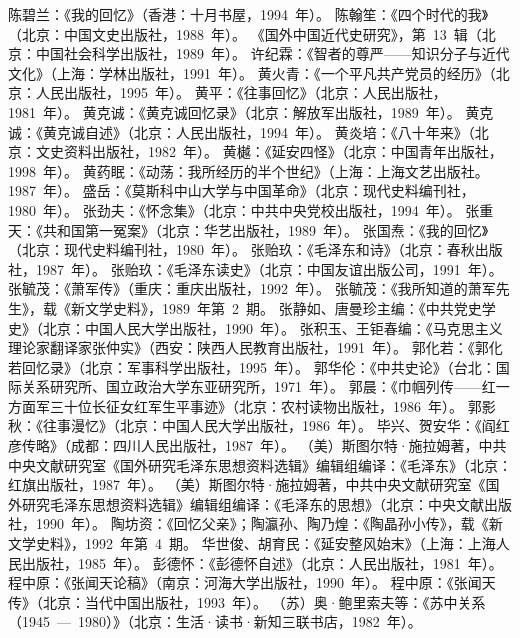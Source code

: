 \begin{thebibliography}{999}
\bibitem{}陈碧兰：《我的回忆》（香港：十月书屋，1994~年）。
\bibitem{}陈翰笙：《四个时代的我》（北京：中国文史出版社，1988~年）。
\bibitem{}《国外中国近代史研究》，第~13~辑（北京：中国社会科学出版社，1989~年）。
\bibitem{}许纪霖：《智者的尊严——知识分子与近代文化》（上海：学林出版社，1991~年）。
\bibitem{}黄火青：《一个平凡共产党员的经历》（北京：人民出版社，1995~年）。
\bibitem{}黄平：《往事回忆》（北京：人民出版社，1981~年）。
\bibitem{}黄克诚：《黄克诚回忆录》（北京：解放军出版社，1989~年）。
\bibitem{}黄克诚：《黄克诚自述》（北京：人民出版社，1994~年）。
\bibitem{}黄炎培：《八十年来》（北京：文史资料出版社，1982~年）。
\bibitem{}黄樾：《延安四怪》（北京：中国青年出版社，1998~年）。
\bibitem{}黄药眠：《动荡：我所经历的半个世纪》（上海：上海文艺出版社。1987~年）。
\bibitem{}盛岳：《莫斯科中山大学与中国革命》（北京：现代史料编刊社，1980~年）。
\bibitem{}张劲夫：《怀念集》（北京：中共中央党校出版社，1994~年）。
\bibitem{}张重天：《共和国第一冤案》（北京：华艺出版社，1989~年）。
\bibitem{}张国焘：《我的回忆》（北京：现代史料编刊社，1980~年）。
\bibitem{}张贻玖：《毛泽东和诗》（北京：春秋出版社，1987~年）。
\bibitem{}张贻玖：《毛泽东读史》（北京：中国友谊出版公司，1991~年）。
\bibitem{}张毓茂：《萧军传》（重庆：重庆出版社，1992~年）。
\bibitem{}张毓茂：《我所知道的萧军先生》，载《新文学史料》，1989~年第~2~期。
\bibitem{}张静如、唐曼珍主编：《中共党史学史》（北京：中国人民大学出版社，1990~年）。
\bibitem{}张积玉、王钜春编：《马克思主义理论家翻译家张仲实》（西安：陕西人民教育出版社，1991~年）。
\bibitem{}郭化若：《郭化若回忆录》（北京：军事科学出版社，1995~年）。
\bibitem{}郭华伦：《中共史论》（台北：国际关系研究所、国立政治大学东亚研究所，1971~年）。
\bibitem{}郭晨：《巾帼列传——红一方面军三十位长征女红军生平事迹》（北京：农村读物出版社，1986~年）。
\bibitem{}郭影秋：《往事漫忆》（北京：中国人民大学出版社，1986~年）。
\bibitem{}毕兴、贺安华：《阎红彦传略》（成都：四川人民出版社，1987~年）。
\bibitem{}（美）斯图尔特·施拉姆著，中共中央文献研究室《国外研究毛泽东思想资料选辑》编辑组编译：《毛泽东》（北京：红旗出版社，1987~年）。
\bibitem{}（美）斯图尔特·施拉姆著，中共中央文献研究室《国外研究毛泽东思想资料选辑》编辑组编译：《毛泽东的思想》（北京：中央文献出版社，1990~年）。
\bibitem{}陶坊资：《回忆父亲》；陶瀛孙、陶乃煌：《陶晶孙小传》，载《新文学史料》，1992~年第~4~期。
\bibitem{}华世俊、胡育民：《延安整风始末》（上海：上海人民出版社，1985~年）。
\bibitem{}彭德怀：《彭德怀自述》（北京：人民出版社，1981~年）。
\bibitem{}程中原：《张闻天论稿》（南京：河海大学出版社，1990~年）。
\bibitem{}程中原：《张闻天传》（北京：当代中国出版社，1993~年）。
\bibitem{}（苏）奥·鲍里索夫等：《苏中关系（1945~—~1980）》（北京：生活·读书·新知三联书店，1982~年）。

\end{thebibliography}
